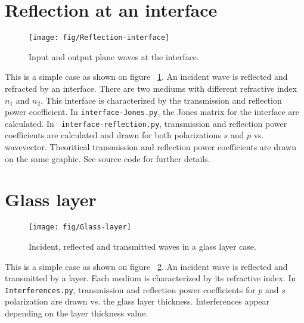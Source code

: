 

\section{Reflection at an interface}
\begin{figure}[!h]
\texttt{[image: fig/Reflection-interface]}
\caption{\label{fig:Reflection-interface}Input and output plane waves at the interface.}
\end{figure}
This is a simple case as shown on figure ~\ref{fig:Reflection-interface}. An incident wave is reflected and refracted by an interface. There are two mediums with different refractive index $n_1$ and $n_2$. This interface is characterized by the transmission and reflection power coefficient. In \verb/interface-Jones.py/, the Jones matrix for the interface are calculated. In \verb/ interface-reflection.py/, transmission and reflection power coefficients are calculated and drawn for both polarizations $s$ and $p$ vs. wavevector. Theoritical transmission and reflection power coefficients are drawn on the same graphic. See source code for further details.

\section{Glass layer}
\begin{figure}[!h]
\texttt{[image: fig/Glass-layer]}
\caption{\label{fig:Glass-layer}Incident, reflected and transmitted waves in a glass layer case.}
\end{figure}
This is a simple case as shown on figure ~\ref{fig:Glass-layer}. An incident wave is reflected and transmitted by a layer. Each medium is characterized by its refractive index.
In \verb/Interferences.py/, transmission and reflection power coefficients for $p$ and $s$ polarization are drawn vs. the glass layer thickness. Interferences appear depending on the layer thickness value.



